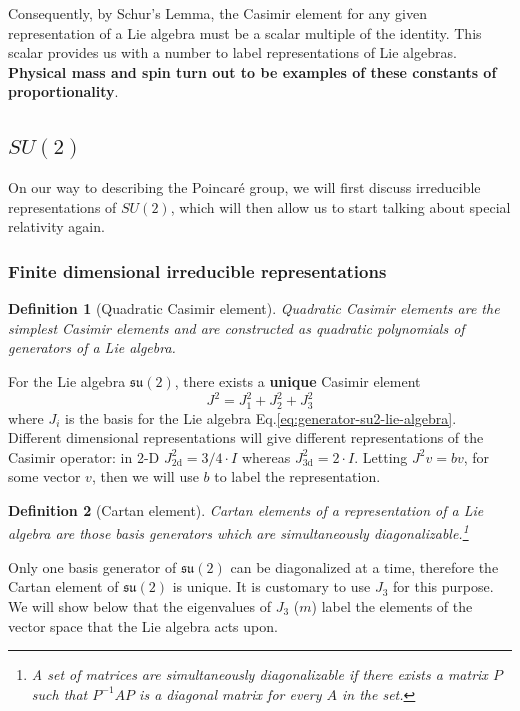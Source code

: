\documentclass[11pt]{article}
\numberwithin{equation}{section}
\newtheorem{defn}{Definition}[section]
\begin{document}
Consequently, by Schur's Lemma, the Casimir element for any given representation of a Lie algebra must be a scalar multiple of the identity. This scalar provides us with a number to label representations of Lie algebras. \textbf{Physical mass and spin turn out to be examples of these constants of proportionality}.

\subsection{$SU(2)$}

On our way to describing the Poincar\'{e} group, we will first discuss irreducible representations of $SU(2)$, which will then allow us to start talking about special relativity again.

\subsubsection{Finite dimensional irreducible representations}

\begin{defn}[Quadratic Casimir element]
Quadratic Casimir elements are the simplest Casimir elements and are constructed as quadratic polynomials of generators of a Lie algebra.
\end{defn}

For the Lie algebra $\mathfrak{su}(2)$, there exists a \textbf{unique} Casimir element
\begin{equation}
J^2 = J_1^2 + J_2^2 + J_3^2
\end{equation}
where $J_i$ is the basis for the Lie algebra Eq.\eqref{eq:generator-su2-lie-algebra}. Different dimensional representations will give different representations of the Casimir operator: in 2-D $J^2_{2\mathrm{d}}=3/4 \cdot I$ whereas $J^2_{3\mathrm{d}}=2 \cdot I$. Letting $J^2 v = b v$, for some vector $v$, then we will use $b$ to label the representation.

\begin{defn}[Cartan element]
Cartan elements of a representation of a Lie algebra are those basis generators which are simultaneously diagonalizable.\footnote{A set of matrices are simultaneously diagonalizable if there exists a matrix $P$ such that $P^{-1}AP$ is a diagonal matrix for every $A$ in the set.}
\end{defn}

Only one basis generator of $\mathfrak{su}(2)$ can be diagonalized at a time, therefore the Cartan element of $\mathfrak{su}(2)$ is unique. It is customary to use $J_3$ for this purpose. We will show below that the eigenvalues of $J_3$ ($m$) label the elements of the vector space that the Lie algebra acts upon.
\end{document}
